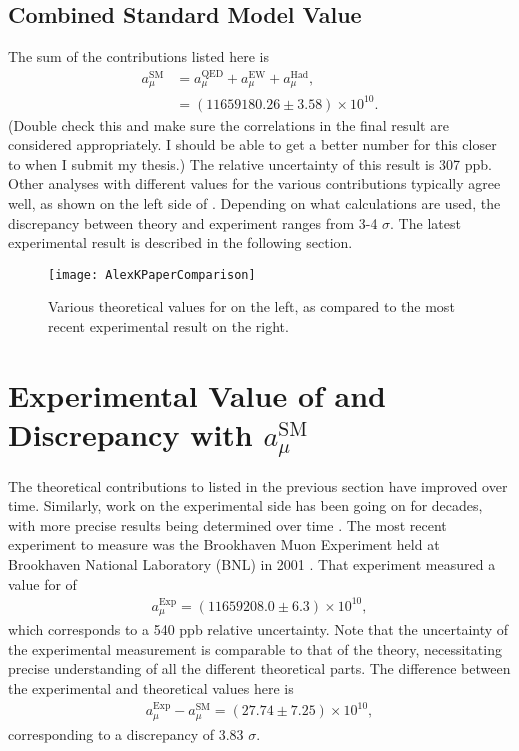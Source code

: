 \subsection{Combined Standard Model Value}

The sum of the \amu contributions listed here is
		\begin{equation}
		\begin{aligned}
            a_{\mu}^{\text{SM}} &= a_{\mu}^{\text{QED}} + a_{\mu}^{\text{EW}} + a_{\mu}^{\text{Had}}, \\
			&= (11659180.26 \pm 3.58) \times 10^{10}.
		\end{aligned}
		\end{equation}
(Double check this and make sure the correlations in the final result are considered appropriately. I should be able to get a better number for this closer to when I submit my thesis.) The relative uncertainty of this result is 307 ppb. Other analyses with different values for the various contributions typically agree well, as shown on the left side of . Depending on what calculations are used, the discrepancy between theory and experiment ranges from 3-4 $\sigma$. The latest experimental result is described in the following section.

\begin{figure}[]
	\centering
	\texttt{[image: AlexKPaperComparison]}
	\caption[AlexKPaperComparison]{Various theoretical values for \amu on the left, as compared to the most recent experimental result on the right. \cite{Keshavarzi:2018mgv}}
	\label{fig:AlexKPaperComparison}
\end{figure}


\section{Experimental Value of \amu and Discrepancy with \texorpdfstring{$a_{\mu}^{\text{SM}}$}{amusm}}
\label{sec:Background}


The theoretical contributions to \amu listed in the previous section have improved over time. Similarly, work on the experimental side has been going on for decades, with more precise results being determined over time \cite{PastExperiments}. The most recent experiment to measure \gmtwo was the Brookhaven Muon \gmtwo Experiment held at Brookhaven National Laboratory (BNL) in 2001 \cite{E821FinalReport}. That experiment measured a value for \amu of 
		\begin{align}
            a_{\mu}^{\text{Exp}} = (11659208.0 \pm 6.3) \times 10^{10},
		\end{align}
which corresponds to a 540 ppb relative uncertainty. Note that the uncertainty of the experimental measurement is comparable to that of the theory, necessitating precise understanding of all the different theoretical parts. The difference between the experimental and theoretical values here is
		\begin{align}
            a_{\mu}^{\text{Exp}} - a_{\mu}^{\text{SM}} = (27.74 \pm 7.25) \times 10^{10},
		\end{align}
corresponding to a discrepancy of 3.83 $\sigma$.



